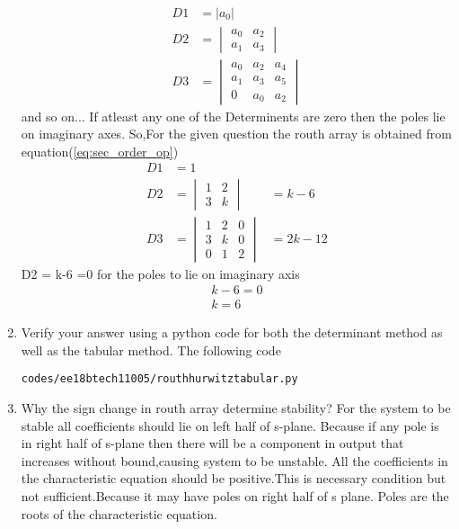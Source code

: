 \begin{enumerate}[label=\thesection.\arabic*.,ref=\thesection.\theenumi]
{\cdots \\}
\begin{align}
D1 &= |a_0|
\\
D2 &= \begin{vmatrix}
a_0 & a_2 \\ a_1 & a_3 \end{vmatrix}
\\
D3 &=\begin{vmatrix}
a_0 & a_2 & a_4 \\ a_1 & a_3 & a_5 \\ 0 & a_0 & a_2 \end{vmatrix}
\end{align}
and so on...
If atleast any one of the Determinents are zero then the poles lie on imaginary axes.
So,For the given question the routh array is obtained from equation(\ref{eq:sec_order_op})
\begin{align}
D1 &= 1
\\
D2 &= \begin{vmatrix}
1 & 2 \\ 3 & k \end{vmatrix} 
&= k-6
\\
D3 &=\begin{vmatrix}
1 & 2 & 0 \\ 3 & k & 0 \\ 0 & 1 & 2 \end{vmatrix}
&=2k-12
\end{align}
D2 = k-6 =0 for the poles to lie on imaginary axis
\begin{align}
   k-6 = 0\\
   k = 6
\end{align}
\item Verify your answer using a python code for both the determinant method as well as the tabular method.
\solution 
The following code 
%
\begin{lstlisting}
codes/ee18btech11005/routhhurwitztabular.py
\end{lstlisting}
\item Why the sign change in routh array determine stability?
\solution For the system to be stable all coefficients should lie on left half of s-plane. Because if any pole is in right half of s-plane then there will be a component in output that increases without bound,causing system to be unstable.
All the coefficients in the characteristic equation should be positive.This is necessary condition but not sufficient.Because it may have poles on right half of s plane.
Poles are the roots of the characteristic equation.

\end{enumerate}
